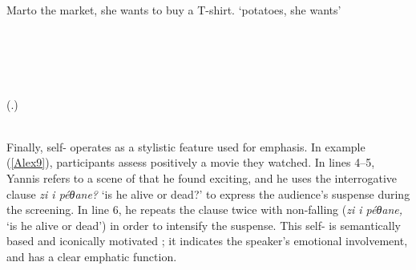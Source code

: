 \documentclass[output=paper]{LSP/langsci}
\begin{document}
\begin{Transcript}[FS {>}{>\hspace{0.1in}}]{Mar}{to the market, she wants to buy a T-shirt.}
{		\glt  `potatoes, she wants'}\\
\\
\\
\\ 	
 \\	
\\
		\hspace{1in}(.)\\
\\
\end{Transcript}

Finally, self- operates as a stylistic feature used for emphasis. In example (\ref{Alex9}), participants assess positively a movie they watched. In lines 4--5, Yannis refers to a scene of  that he found exciting, and he uses the interrogative clause \textit{zi i péθane?} `is he alive or dead?' to express the audience’s suspense during the screening. In line 6, he repeats the clause twice with non-falling  (\textit{zi i péθane,} `is he alive or dead') in order to intensify the suspense. This self- is semantically based and iconically motivated \citep[cf.][]{norrick87}; it indicates the speaker’s emotional involvement, and has a clear emphatic function. 
\end{document}
